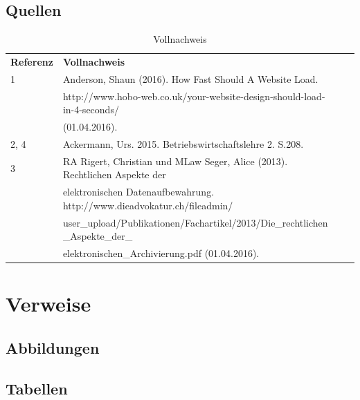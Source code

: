 \documentclass[a4paper]{scrreprt}
\makeatletter
\renewcommand\listoffigures{%
        \@starttoc{lof}%
}
\renewcommand\listoftables{%
        \@starttoc{lot}%
}
\makeatother
\begin{document}
\pagebreak



\section{Quellen}

\begin{table}[h]
\label{tab_quellen}
\begin{tabular}{llll}
{\textbf{Referenz}} & {\textbf{Vollnachweis}} 							\\
1 		&  Anderson, Shaun (2016). How Fast Should A Website Load. \\
		& http://www.hobo-web.co.uk/your-website-design-should-load-in-4-seconds/ \\
		& (01.04.2016). \\
		
2, 4 	&  Ackermann, Urs. 2015. Betriebswirtschaftslehre 2. S.208.\\

3 		& RA Rigert, Christian und MLaw Seger, Alice (2013). Rechtlichen Aspekte der \\
		& elektronischen Datenaufbewahrung. http://www.dieadvokatur.ch/fileadmin/ \\
		& user\_upload/Publikationen/Fachartikel/2013/Die\_rechtlichen \_Aspekte\_der\_ \\
		& elektronischen\_Archivierung.pdf (01.04.2016).\\

\end{tabular}
\caption[Vollnachweis]{Vollnachweis}
\end{table}




\chapter*{Verweise}
\section*{Abbildungen}
\listoffigures

\section*{Tabellen}
\listoftables

\printindex
\end{document}
